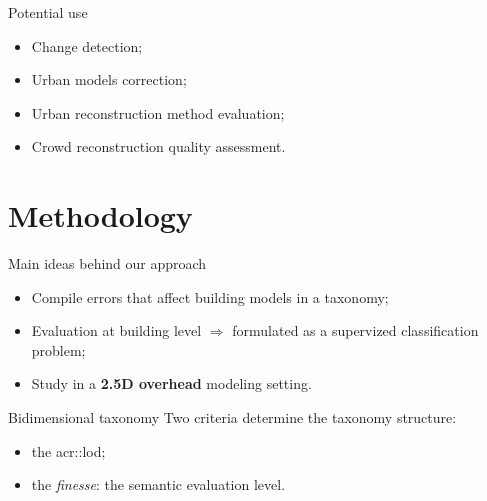 \documentclass[export]{beamer}
\begin{document}
        \begin{frame}{Potential use}
            \begin{itemize}[label=$\blacktriangleright$, font=\color{IGNGreen}, itemsep=2em]
                \item<1-> Change detection;
                \item<2-> Urban models correction;
                \item<3-> Urban reconstruction method evaluation;
                \item<4-> Crowd reconstruction quality assessment.
            \end{itemize}
        \end{frame}

    \section{Methodology}
        \begin{frame}{Main ideas behind our approach}
            \begin{itemize}[label=$\blacktriangleright$, font=\color{IGNGreen}]
                \item<1-> Compile errors that affect building models in a taxonomy;
                \item<2-> Evaluation at building level $\Longrightarrow$ formulated as a supervized classification problem;
                \item<3-> Study in a \textbf{2.5D overhead} modeling setting.
            \end{itemize}
        \end{frame}
        \begin{frame}{Bidimensional taxonomy}
            Two criteria determine the taxonomy structure:
            \begin{itemize}[label=$\blacktriangleright$, font=\color{IGNGreen}]
                \item<1-> the \acrshort{acr::lod};
                \item<2-> the \emph{finesse}: the semantic evaluation level.
            \end{itemize}
        \end{frame}
\end{document}
